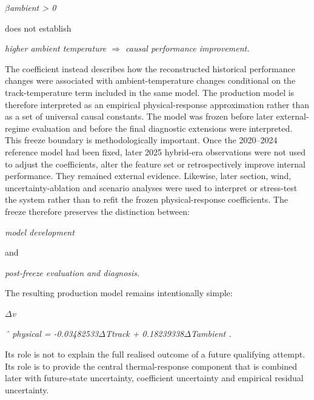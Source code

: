 \begin{center}\textit{\ensuremath{\beta}ambient > 0}\end{center}

does not establish

\begin{center}\textit{higher ambient temperature \ensuremath{\Rightarrow} causal performance improvement.}\end{center}

The coefficient instead describes how the reconstructed historical performance changes were associated with ambient-temperature changes conditional on the track-temperature term included in the same model. The production model is therefore interpreted as an empirical physical-response approximation rather than as a set of universal causal constants. The model was frozen before later external-regime evaluation and before the final diagnostic extensions were interpreted. This freeze boundary is methodologically important. Once the 2020--2024 reference model had been fixed, later 2025 hybrid-era observations were not used to adjust the coefficients, alter the feature set or retrospectively improve internal performance. They remained external evidence. Likewise, later section, wind, uncertainty-ablation and scenario analyses were used to interpret or stress-test the system rather than to refit the frozen physical-response coefficients. The freeze therefore preserves the distinction between:

\begin{center}\textit{model development}\end{center}

and

\begin{center}\textit{post-freeze evaluation and diagnosis.}\end{center}

The resulting production model remains intentionally simple:

\begin{center}\textit{\ensuremath{\Delta}v}\end{center}

\begin{center}\textit{ˆ physical = -0.03482533\ensuremath{\Delta}Ttrack + 0.18239338\ensuremath{\Delta}Tambient .}\end{center}

Its role is not to explain the full realised outcome of a future qualifying attempt. Its role is to provide the central thermal-response component that is combined later with future-state uncertainty, coefficient uncertainty and empirical residual uncertainty.

